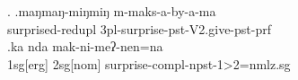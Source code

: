  
\ex. \ag.maŋmaŋ-miŋmiŋ m-maks-a-by-a-ma\\
	surprised{\sc -redupl} {\sc 3pl-}surprise{\sc -pst-V2.give-pst-prf}\\
	 
 	\bg.ka nda mak-ni-meʔ-nen=na\\
	{\sc 1sg[erg]} {\sc 2sg[nom]} surprise{\sc -compl-npst-1>2=nmlz.sg}		\\
	

 
 
 
 
